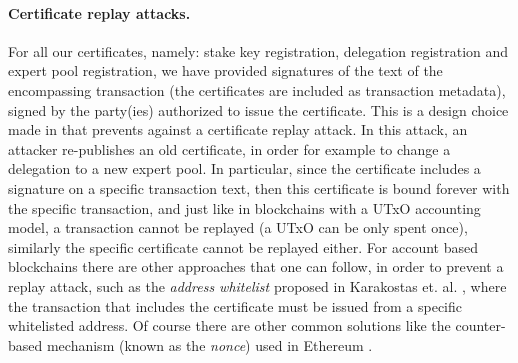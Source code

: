 \paragraph{Certificate replay attacks.}
For all our certificates, namely: stake key registration, delegation registration and expert pool registration, we have provided signatures of the text of the encompassing transaction (the certificates are included as transaction metadata), signed by the party(ies) authorized to issue the certificate. This is a design choice made in \cite{deldesign} that prevents against a certificate replay attack. In this attack, an attacker re-publishes an old certificate, in order for example to change a delegation to a new expert pool. In particular, since the certificate includes a signature on a specific transaction text, then this certificate is bound forever with the specific transaction, and just like in blockchains with a UTxO accounting model, a transaction cannot be replayed (a UTxO can be only spent once), similarly the specific certificate cannot be replayed either. For account based blockchains there are other approaches that one can follow, in order to prevent a replay attack, such as the \emph{address whitelist} proposed in Karakostas et. al. \cite{stakepools}, where the transaction that includes the certificate must be issued from a specific whitelisted address. Of course there are other common solutions like the counter-based mechanism (known as the \emph{nonce}) used in Ethereum \cite{ethereum}.


